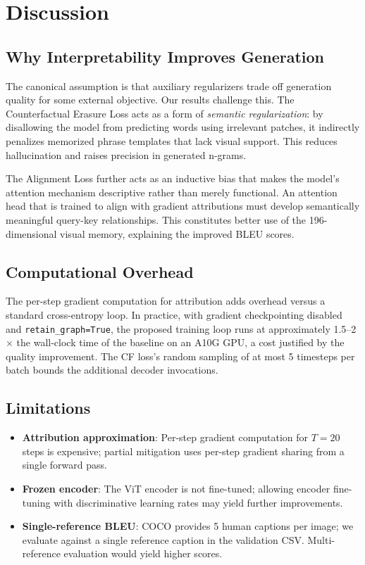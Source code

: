 \documentclass[conference]{IEEEtran}
\begin{document}
\section{Discussion}
\label{sec:disc}

\subsection{Why Interpretability Improves Generation}

The canonical assumption is that auxiliary regularizers trade off generation quality for some external objective. Our results challenge this. The Counterfactual Erasure Loss acts as a form of \textit{semantic regularization}: by disallowing the model from predicting words using irrelevant patches, it indirectly penalizes memorized phrase templates that lack visual support. This reduces hallucination and raises precision in generated n-grams.

The Alignment Loss further acts as an inductive bias that makes the model's attention mechanism descriptive rather than merely functional. An attention head that is trained to align with gradient attributions must develop semantically meaningful query-key relationships. This constitutes better use of the 196-dimensional visual memory, explaining the improved BLEU scores.

\subsection{Computational Overhead}

The per-step gradient computation for attribution adds overhead versus a standard cross-entropy loop. In practice, with gradient checkpointing disabled and \texttt{retain\_graph=True}, the proposed training loop runs at approximately 1.5--2$\times$ the wall-clock time of the baseline on an A10G GPU, a cost justified by the quality improvement. The CF loss's random sampling of at most 5 timesteps per batch bounds the additional decoder invocations.

\subsection{Limitations}

\begin{itemize}
    \item \textbf{Attribution approximation}: Per-step gradient computation for $T=20$ steps is expensive; partial mitigation uses per-step gradient sharing from a single forward pass.
    \item \textbf{Frozen encoder}: The ViT encoder is not fine-tuned; allowing encoder fine-tuning with discriminative learning rates may yield further improvements.
    \item \textbf{Single-reference BLEU}: COCO provides 5 human captions per image; we evaluate against a single reference caption in the validation CSV. Multi-reference evaluation would yield higher scores.
\end{itemize}
\end{document}
